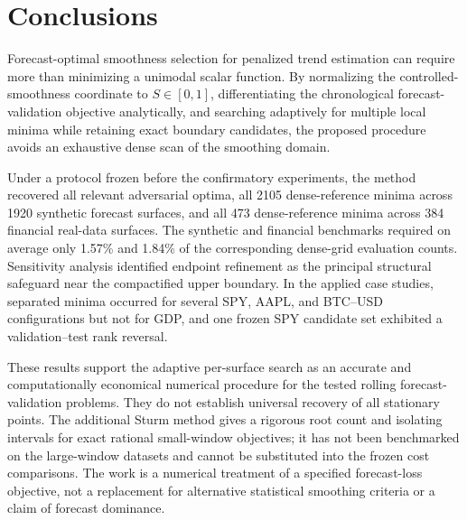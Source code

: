 \documentclass[english]{smcca}
\begin{document}
\section{Conclusions}

Forecast-optimal smoothness selection for penalized trend estimation can require more than minimizing a unimodal scalar function. By normalizing the controlled-smoothness coordinate to \(S\in[0,1]\), differentiating the chronological forecast-validation objective analytically, and searching adaptively for multiple local minima while retaining exact boundary candidates, the proposed procedure avoids an exhaustive dense scan of the smoothing domain.

Under a protocol frozen before the confirmatory experiments, the method recovered all relevant adversarial optima, all 2105 dense-reference minima across 1920 synthetic forecast surfaces, and all 473 dense-reference minima across 384 financial real-data surfaces. The synthetic and financial benchmarks required on average only 1.57\% and 1.84\% of the corresponding dense-grid evaluation counts. Sensitivity analysis identified endpoint refinement as the principal structural safeguard near the compactified upper boundary. In the applied case studies, separated minima occurred for several SPY, AAPL, and BTC--USD configurations but not for GDP, and one frozen SPY candidate set exhibited a validation--test rank reversal.

These results support the adaptive per-surface search as an accurate and computationally economical numerical procedure for the tested rolling forecast-validation problems. They do not establish universal recovery of all stationary points. The additional Sturm method gives a rigorous root count and isolating intervals for exact rational small-window objectives; it has not been benchmarked on the large-window datasets and cannot be substituted into the frozen cost comparisons. The work is a numerical treatment of a specified forecast-loss objective, not a replacement for alternative statistical smoothing criteria or a claim of forecast dominance.



\end{document}

